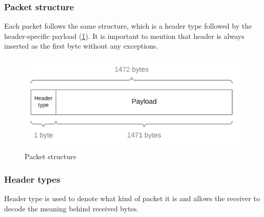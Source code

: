 \documentclass[times, utf8, diplomski]{fer}
\begin{document}
\subsubsection{Packet structure}
Each packet follows the same structure, which is a header type followed by the header-specific payload (\ref{fig:packet-structure}). It is important to mention that header is always inserted as the first byte without any exceptions.

\begin{figure}[h!]
	\centering
	\includegraphics[scale=0.25]{Packet-structure}
	\caption{Packet structure}
	\label{fig:packet-structure}
\end{figure}


\subsubsection{Header types}
Header type is used to denote what kind of packet it is and allows the receiver to decode the meaning behind received bytes.
\end{document}

